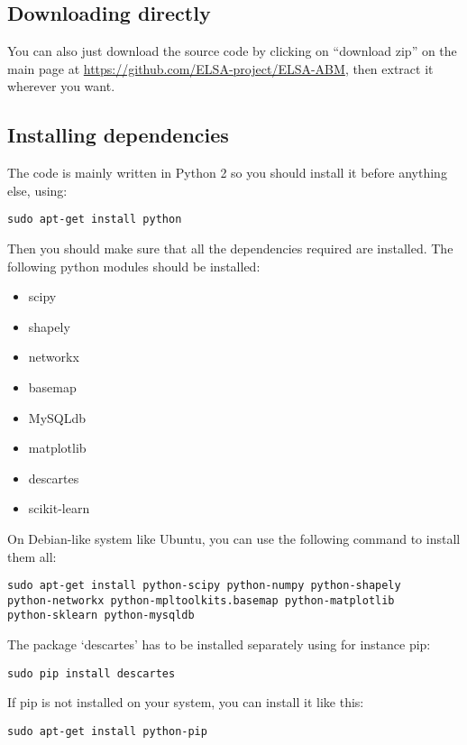\documentclass[12pt]{article}
\begin{document}
\subsection{Downloading directly}

You can also just download the source code by clicking on ``download zip'' on the main page at \url{https://github.com/ELSA-project/ELSA-ABM}, then extract it wherever you want.

\subsection{Installing dependencies}

The code is mainly written in Python 2 so you should install it before anything else, using:

\begin{verbatim}
sudo apt-get install python
\end{verbatim}

Then you should make sure that all the dependencies required are installed. The following python modules should be installed:

\begin{itemize}
\item scipy
\item shapely
\item networkx
\item basemap
\item MySQLdb
\item matplotlib
\item descartes
\item scikit-learn
\end{itemize}

On Debian-like system like Ubuntu, you can use the following command to install them all:

\begin{verbatim}
sudo apt-get install python-scipy python-numpy python-shapely 
python-networkx python-mpltoolkits.basemap python-matplotlib 
python-sklearn python-mysqldb
\end{verbatim}

The package `descartes' has to be installed separately using for instance pip:
\begin{verbatim}
sudo pip install descartes
\end{verbatim}

If pip is not installed on your system, you can install it like this:

\begin{verbatim}
sudo apt-get install python-pip 
\end{verbatim}
\end{document}
